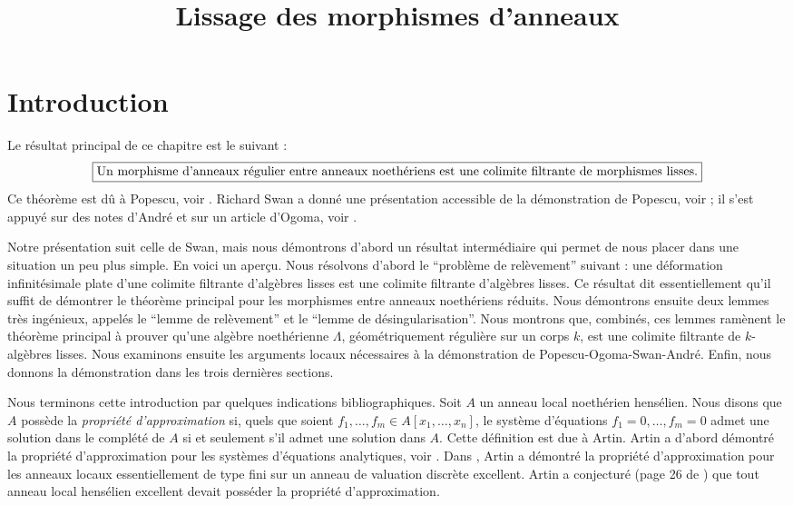 

%


\title{Lissage des morphismes d'anneaux}


\maketitle

\label{section-phantom}

\tableofcontents

\section{Introduction}
\label{section-introduction}

\noindent
Le résultat principal de ce chapitre est le suivant :
$$
\fbox{Un morphisme d'anneaux régulier entre anneaux noethériens est une
colimite filtrante de morphismes lisses.}
$$
Ce théorème est dû à Popescu, voir \cite{popescu-letter}.
Richard Swan a donné une présentation accessible de la démonstration de Popescu,
voir \cite{swan} ; il s'est appuyé sur des notes d'Andr\'e et sur un article d'Ogoma, voir
\cite{Ogoma}.

\medskip\noindent
Notre présentation suit celle de Swan, mais nous démontrons d'abord un résultat
intermédiaire qui permet de nous placer dans une situation un peu plus simple.
En voici un aperçu. Nous résolvons d'abord le ``problème de relèvement'' suivant :
une déformation infinitésimale plate d'une colimite filtrante d'algèbres lisses
est une colimite filtrante d'algèbres lisses. Ce résultat dit essentiellement
qu'il suffit de démontrer le théorème principal pour les morphismes entre
anneaux noethériens réduits. Nous démontrons ensuite deux lemmes très ingénieux,
appelés le ``lemme de relèvement'' et le ``lemme de désingularisation''.
Nous montrons que, combinés, ces lemmes ramènent le théorème principal à prouver
qu'une algèbre noethérienne $\Lambda$, géométriquement régulière sur un corps $k$,
est une colimite filtrante de $k$-algèbres lisses. Nous examinons ensuite les
arguments locaux nécessaires à la démonstration de Popescu-Ogoma-Swan-Andr\'e.
Enfin, nous donnons la démonstration dans les trois dernières sections.

\medskip\noindent
Nous terminons cette introduction par quelques indications bibliographiques.
Soit $A$ un anneau local noethérien hensélien.
Nous disons que $A$ possède la {\it propriété d'approximation} si, quels que soient
$f_1, \ldots, f_m \in A[x_1, \ldots, x_n]$, le système d'équations
$f_1 = 0, \ldots, f_m = 0$ admet une solution dans le complété de $A$ si et
seulement s'il admet une solution dans $A$. Cette définition est due à Artin.
Artin a d'abord démontré la propriété d'approximation pour les systèmes
d'équations analytiques, voir \cite{Artin-Analytic-Approximation}.
Dans \cite{Artin-Algebraic-Approximation}, Artin a démontré la propriété
d'approximation pour les anneaux locaux essentiellement de type fini sur un
anneau de valuation discrète excellent.
Artin a conjecturé (page 26 de \cite{Artin-Algebraic-Approximation}) que tout
anneau local hensélien excellent devait posséder la propriété d'approximation.

